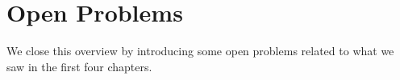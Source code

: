 \chapter{Open Problems}

We close this overview by introducing some open problems related to what we saw
in the first four chapters.


